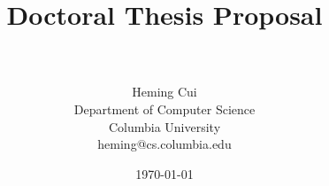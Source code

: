 \documentclass[12pt]{article}
\title{
{Doctoral Thesis Proposal} \\
~\\
\bf \mytitle}
\author{ {Heming Cui}  \\
Department of Computer Science \\
Columbia University\\
{\small heming@cs.columbia.edu} \\
}
\date{\today}
\begin{document}
\pagestyle{plain}
\maketitle

\pagebreak
\begin{abstract}

\end{abstract}

\pagebreak
\tableofcontents
\pagebreak

\cleardoublepage
{}













\begin{footnotesize}


\end{footnotesize}
\end{document}
